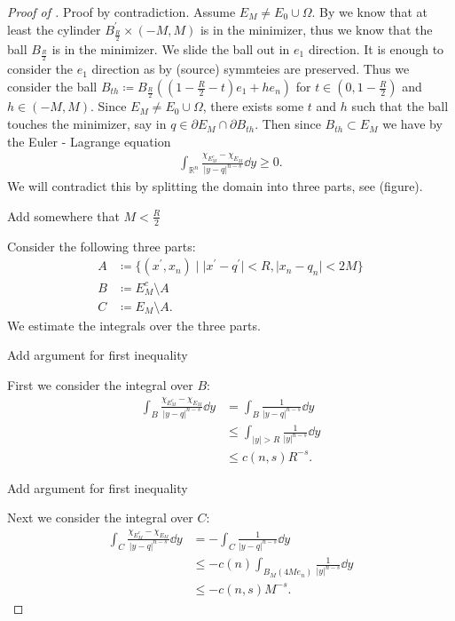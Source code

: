 \begin{proof}[Proof of ]
	Proof by contradiction. Assume \( E_M \neq E_0 \cup \Omega \). By  we know
	that at least the cylinder \( B^\prime_{\frac{R}{2}} \times (- M, M) \) is in the
	minimizer, thus we know that the ball \( B_{\frac{R}{2}} \) is in the minimizer. We
	slide the ball out in \( e_1 \) direction. It is enough to consider the \( e_1 \)
	direction as by (source) symmteies are preserved. Thus we consider the ball \( B_{th} \coloneqq
	B_{\frac{R}{2}} ((1 - \frac{R}{2} - t)e_1 + h e_n) \) for \( t \in (0, 1 - \frac{R}{2}
	) \) and \( h \in (- M, M) \). Since \( E_M \neq E_0 \cup \Omega \), there exists
	some \( t \) and \( h \) such that the ball touches the minimizer, say in \( q \in
	\partial E_M \cap \partial B_{th} \). Then since \( B_{th} \subset E_M \) we have
	by the Euler - Lagrange equation
	\begin{gather*}
		\int_{\mathbb{R}^n} \frac{\chi_{E_M^c} - \chi_{E_M}}{\lvert y - q \rvert^{n - s}} \dd{y} \geq 0.
	\end{gather*}
	We will contradict this by splitting the domain into three parts, see (figure).

	\begin{TODO}
		Add somewhere that \( M < \frac{R}{2} \)
	\end{TODO}
	Consider the following three parts:
	\begin{align*}
		A & \coloneqq \{(x^\prime, x_n) \mid \lvert x^\prime - q^\prime \rvert < R, \lvert x_n - q_n \rvert < 2M \} \\
		B & \coloneqq E_M^c \setminus A \\
		C & \coloneqq E_M \setminus A.
	\end{align*}
	We estimate the integrals over the three parts.

	\begin{TODO}
		Add argument for first inequality
	\end{TODO}
	First we consider the integral over \( B \):
	\begin{align*}
		\int_B \frac{\chi_{E_M^c} - \chi_{E_M}}{\lvert y - q \rvert^{n - s}} \dd{y}
		 & = \int_B \frac{1}{\lvert y - q \rvert^{n - s}} \dd{y} \\
		 & \leq \int_{\lvert y \rvert > R} \frac{1}{\lvert y \rvert^{n - s}} \dd{y} \\
		 & \leq c(n, s) R^{- s}.
	\end{align*}

	\begin{TODO}
		Add argument for first inequality
	\end{TODO}
	Next we consider the integral over \( C \):
	\begin{align*}
		\int_C \frac{\chi_{E_M^c} - \chi_{E_M}}{\lvert y - q \rvert^{n - s}} \dd{y}
		 & = - \int_C \frac{1}{\lvert y - q \rvert^{n - s}} \dd{y} \\
		 & \leq - c(n) \int_{B_M (4Me_n)} \frac{1}{\lvert y \rvert^{n - s}} \dd{y} \\
		 & \leq - c(n, s) M^{- s}.
	\end{align*}


\end{proof}
